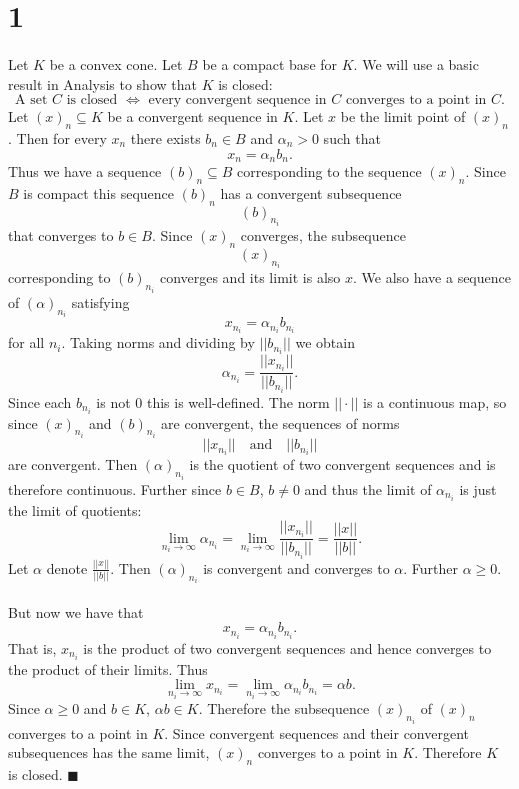 \documentclass[letterpaper,12pt,oneside,onecolumn]{article}
\begin{document}
\section*{1}
\paragraph{}
Let $K$ be a convex cone. Let $B$ be a compact base for $K$.  We will use a basic result in Analysis to show that $K$ is closed:
$$
\text{A set $C$ is closed $\iff$ every convergent sequence in $C$ converges to a point in $C$.}
$$
Let $(x)_n \subseteq K$ be a convergent sequence in $K$. Let $x$ be the limit point of $(x)_n$. Then for every $x_n$ there exists $b_n \in B$ and $\alpha_n > 0$ such that
$$x_n = \alpha_n b_n.$$
Thus we have a sequence $(b)_n \subseteq B$ corresponding to the sequence $(x)_n$. Since $B$ is compact this sequence $(b)_n$ has a convergent subsequence $$(b)_{n_i}$$ that converges to $b \in B$.
Since $(x)_n$ converges, the subsequence $$(x)_{n_i}$$ corresponding to $(b)_{n_i}$ converges and its limit is also $x$. We also have a sequence of $(\alpha)_{n_i}$ satisfying
$$x_{n_i} = \alpha_{n_i} b_{n_i}$$
for all $n_i$.
Taking norms and dividing by $||b_{n_i}||$ we obtain
$$\alpha_{n_i} = \frac{||x_{n_i}||}{||b_{n_i}||}.$$
Since each $b_{n_i}$ is not $0$ this is well-defined. The norm $||\cdot||$ is a continuous map, so since $(x)_{n_i}$ and $(b)_{n_i}$ are convergent, the sequences of norms
$$||x_{n_i}|| \quad \text{and}\quad ||b_{n_i}||$$
are convergent. Then $(\alpha)_{n_i}$ is the quotient of two convergent sequences and is therefore continuous. Further since $b \in B$, $b \neq 0 $ and thus the limit of $\alpha_{n_i}$ is just the limit of quotients:
$$\lim_{n_i \rightarrow \infty} \alpha_{n_i} = \lim_{n_i \rightarrow \infty} \frac{||x_{n_i}||}{||b_{n_i}||} = \frac{||x||}{||b||}.$$
Let $\alpha$ denote $\frac{||x||}{||b||}$. Then $(\alpha)_{n_i}$ is convergent and converges to $\alpha$. Further $\alpha \geq 0$.
\paragraph{}
But now we have that
$$x_{n_i} = \alpha_{n_i} b_{n_i}.$$
That is, $x_{n_i}$ is the product of two convergent sequences and hence converges to the product of their limits. Thus
$$\lim_{n_i \rightarrow \infty} x_{n_i} = \lim_{n_i \rightarrow \infty} \alpha_{n_i} b_{n_i} =\alpha b.$$
Since $\alpha \geq 0$ and $b \in K$, $\alpha b \in K$. Therefore the subsequence $(x)_{n_i}$ of $(x)_n$ converges to a point in $K$. Since convergent sequences and their convergent subsequences has the same limit, $(x)_n$ converges to a point in $K$. Therefore $K$ is closed. $\blacksquare$
\end{document}
